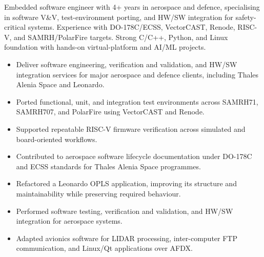 \documentclass[10pt,a4paper,ragged2e]{altacv}
\begin{document}


\begin{fullwidth}
\makecvheader
\end{fullwidth}



Embedded software engineer with 4+ years in aerospace and defence, specialising in software V\&V, test-environment porting, and HW/SW integration for safety-critical systems. Experience with DO-178C/ECSS, VectorCAST, Renode, RISC-V, and SAMRH/PolarFire targets. Strong C/C++, Python, and Linux foundation with hands-on virtual-platform and AI/ML projects.


\begin{itemize}
  \item Deliver software engineering, verification and validation, and HW/SW integration services for major aerospace and defence clients, including Thales Alenia Space and Leonardo.
  \item Ported functional, unit, and integration test environments across SAMRH71, SAMRH707, and PolarFire using VectorCAST and Renode.
  \item Supported repeatable RISC-V firmware verification across simulated and board-oriented workflows.
  \item Contributed to aerospace software lifecycle documentation under DO-178C and ECSS standards for Thales Alenia Space programmes.
  \item Refactored a Leonardo OPLS application, improving its structure and maintainability while preserving required behaviour.
\end{itemize}

\begin{itemize}
  \item Performed software testing, verification and validation, and HW/SW integration for aerospace systems.
  \item Adapted avionics software for LIDAR processing, inter-computer FTP communication, and Linux/Qt applications over AFDX.
\end{itemize}
\end{document}
